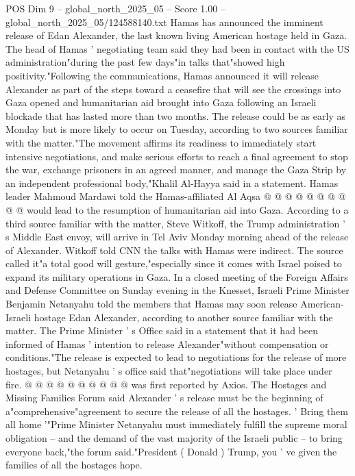 \begin{textsample}{POS Dim 9 – global\_north\_2025\_05 – Score 1.00 – global\_north\_2025\_05/124588140.txt}  \label{ex:f9_pos_368}
Hamas has announced the imminent release of Edan Alexander, the last known living American hostage held in Gaza.
The head of Hamas ' negotiating team said they had been in contact with the US administration"during the past few days"in talks that"showed high positivity."Following the communications, Hamas announced it will release Alexander as part of the steps toward a ceasefire that will see the crossings into Gaza opened and humanitarian aid brought into Gaza following an Israeli blockade that has lasted more than two months.
The release could be as early as Monday but is more likely to occur on Tuesday, according to two sources familiar with the matter."The movement affirms its readiness to immediately start intensive negotiations, and make serious efforts to reach a final agreement to stop the war, exchange prisoners in an agreed manner, and manage the Gaza Strip by an independent professional body,"Khalil Al-Hayya said in a statement.
Hamas leader Mahmoud Mardawi told the Hamas-affiliated Al Aqsa @ @ @ @ @ @ @ @ @ @ would lead to the resumption of humanitarian aid into Gaza.
According to a third source familiar with the matter, Steve Witkoff, the Trump administration ' s Middle East envoy, will arrive in Tel Aviv Monday morning ahead of the release of Alexander.
Witkoff told CNN the talks with Hamas were indirect.
The source called it"a total good will gesture,"especially since it comes with Israel poised to expand its military operations in Gaza.
In a closed meeting of the Foreign Affairs and Defense Committee on Sunday evening in the Knesset, Israeli Prime Minister Benjamin Netanyahu told the members that Hamas may soon release American-Israeli hostage Edan Alexander, according to another source familiar with the matter.
The Prime Minister ' s Office said in a statement that it had been informed of Hamas ' intention to release Alexander"without compensation or conditions."The release is expected to lead to negotiations for the release of more hostages, but Netanyahu ' s office said that"negotiations will take place under fire. @ @ @ @ @ @ @ @ @ @ was first reported by Axios.
The Hostages and Missing Families Forum said Alexander ' s release must be the beginning of a"comprehensive"agreement to secure the release of all the hostages. ' Bring them all home '"Prime Minister Netanyahu must immediately fulfill the supreme moral obligation -- and the demand of the vast majority of the Israeli public -- to bring everyone back,"the forum said."President ( Donald ) Trump, you ' ve given the families of all the hostages hope.

\end{textsample}

